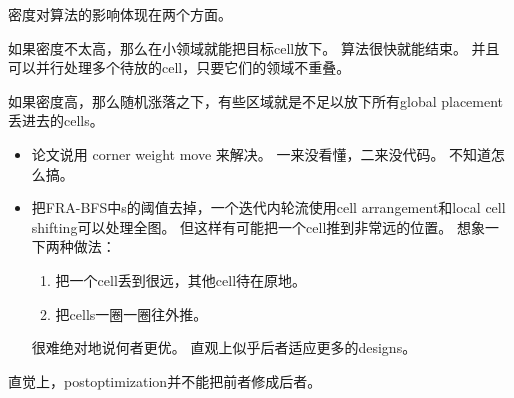 \documentclass[UTF8,a4paper]{ctexart}
\begin{document}
密度对算法的影响体现在两个方面。
\begin{description}
\item[速度的方面] 
    如果密度不太高，那么在小领域就能把目标cell放下。
    算法很快就能结束。
    并且可以并行处理多个待放的cell，只要它们的领域不重叠。
\item[效果的方面]
    如果密度高，那么随机涨落之下，有些区域就是不足以放下所有global placement丢进去的cells。
    \begin{itemize}
    \item 论文说用 corner weight move 来解决。
        一来没看懂，二来没代码。
        不知道怎么搞。
    \item 把FRA-BFS中s的阈值去掉，一个迭代内轮流使用cell arrangement和local cell shifting可以处理全图。
        但这样有可能把一个cell推到非常远的位置。
        想象一下两种做法：
        \begin{enumerate}
        \item 把一个cell丢到很远，其他cell待在原地。
        \item 把cells一圈一圈往外推。
        \end{enumerate}
        很难绝对地说何者更优。
        直观上似乎后者适应更多的designs。
    \end{itemize}
\item 直觉上，postoptimization并不能把前者修成后者。
\end{description}
\end{document}
